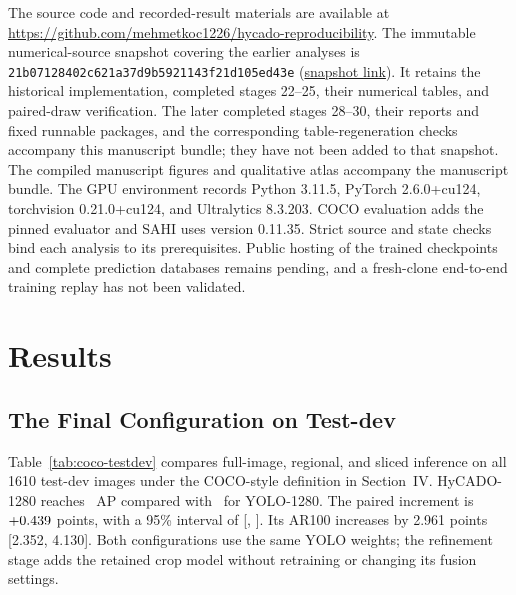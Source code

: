 \documentclass[journal]{IEEEtran}
\begin{document}
The source code and recorded-result materials are available at \url{https://github.com/mehmetkoc1226/hycado-reproducibility}. The immutable numerical-source snapshot covering the earlier analyses is \texttt{21b07128402c621a37d9b5921143f21d105ed43e} (\href{https://github.com/mehmetkoc1226/hycado-reproducibility/tree/21b07128402c621a37d9b5921143f21d105ed43e}{snapshot link}). It retains the historical implementation, completed stages 22--25, their numerical tables, and paired-draw verification. The later completed stages 28--30, their reports and fixed runnable packages, and the corresponding table-regeneration checks accompany this manuscript bundle; they have not been added to that snapshot. The compiled manuscript figures and qualitative atlas accompany the manuscript bundle. The GPU environment records Python 3.11.5, PyTorch 2.6.0+cu124, torchvision 0.21.0+cu124, and Ultralytics 8.3.203. COCO evaluation adds the pinned evaluator and SAHI uses version 0.11.35. Strict source and state checks bind each analysis to its prerequisites. Public hosting of the trained checkpoints and complete prediction databases remains pending, and a fresh-clone end-to-end training replay has not been validated.

\section{Results}
\subsection{The Final Configuration on Test-dev}
Table~\ref{tab:coco-testdev} compares full-image, regional, and sliced inference on all 1610 test-dev images under the COCO-style definition in Section~IV. HyCADO-1280 reaches \CocoH\ AP compared with \CocoY\ for YOLO-1280. The paired increment is $+0.439$ points, with a 95\% interval of [\CocoHYLow, \CocoHYHigh]. Its AR100 increases by 2.961 points [2.352, 4.130]. Both configurations use the same YOLO weights; the refinement stage adds the retained crop model without retraining or changing its fusion settings.

\begin{table}[t]
\caption{COCO-style accuracy on 1610 VisDrone DET test-dev images, with the stated ignore-region preprocessing and maxDets100 per category. All values are on a 0--100 scale. SAHI-640 denotes 640-pixel slices with the same YOLO checkpoint and a model input target of 800; it includes the standard full-image pass. The 800-region variant uses YOLO-1280 for final global predictions. Two-resolution fusion combines the retained YOLO-800 and YOLO-1280 outputs with unchanged scores and final NMS.}
\label{tab:coco-testdev}
\centering\small\setlength{\tabcolsep}{4.8pt}
\end{table}
\end{document}
